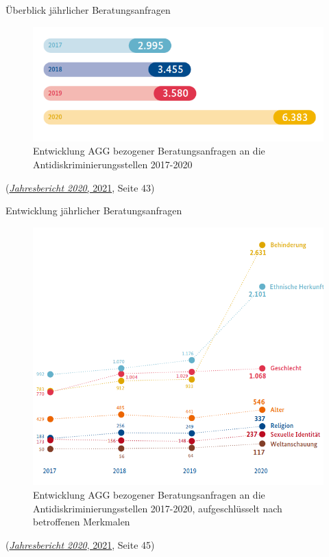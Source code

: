 \documentclass[
  10pt,
  ignorenonframetext,
]{beamer}
\begin{document}
\begin{frame}{Überblick jährlicher Beratungsanfragen}
\protect\hypertarget{uxfcberblick-juxe4hrlicher-beratungsanfragen}{}
\begin{figure}
\centering
\includegraphics[width=\textwidth,height=0.4\textheight]{plots/entwicklung_beratungsanfragen_agg_s43.png}
\caption{Entwicklung AGG bezogener Beratungsanfragen an die
Antidiskriminierungsstellen 2017-2020}
\end{figure}

(\protect\hyperlink{ref-jb2020}{\emph{Jahresbericht 2020}, 2021}, Seite
43)
\end{frame}

\begin{frame}{Entwicklung jährlicher Beratungsanfragen}
\protect\hypertarget{entwicklung-juxe4hrlicher-beratungsanfragen}{}
\begin{figure}
\centering
\includegraphics[width=\textwidth,height=0.5\textheight]{plots/entwicklung_beratungsanfragen_nach_merkmalen_s45.png}
\caption{Entwicklung AGG bezogener Beratungsanfragen an die
Antidiskriminierungsstellen 2017-2020, aufgeschlüsselt nach betroffenen
Merkmalen}
\end{figure}

(\protect\hyperlink{ref-jb2020}{\emph{Jahresbericht 2020}, 2021}, Seite
45)
\end{frame}
\end{document}
